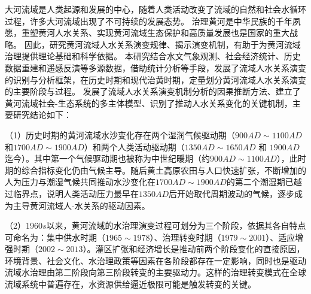 \begin{cabstract}



大河流域是人类起源和发展的中心，随着人类活动改变了流域的自然和社会水循环过程，许多大河流域出现了不可持续的发展态势。
治理黄河是中华民族的千年夙愿，重塑黄河人水关系、实现黄河流域生态保护和高质量发展也是国家的重大战略。
因此，研究黄河流域人水关系演变规律、揭示演变机制，有助于为黄河流域治理提供理论基础和科学依据。
本研究结合水文气象观测、社会经济统计、历史数据重建和遥感反演等多源数据，借助统计分析等手段，发展了流域人水关系演变的识别与分析框架，在历史时期和现代治黄时期，定量划分黄河流域人水关系演变的主要阶段与过程。
发展了流域人水关系演变机制分析的因果推断方法、建立了黄河流域社会-生态系统的多主体模型、识别了推动人水关系变化的关键机制，主要研究结论如下：

（1）历史时期的黄河流域水沙变化存在两个湿润气候驱动期（$900AD\sim1100AD$和$1700AD\sim1900AD$）和两个人类活动驱动期（$1350AD \sim 1650AD$ 和 $1900AD$迄今）。其中第一个气候驱动期也被称为中世纪暖期（约$900AD \sim 1100AD$），此时期的综合指标变化仍由气候主导。随后黄土高原农田与人口快速扩张，不断增加的人为压力与潮湿气候共同推动水沙变化在$1700AD \sim 1900AD$的第二个潮湿期已越过临界点，说明人类活动压力最早在$1350AD$后开始取代周期波动的气候，逐步成为主导黄河流域人-水关系的驱动因素。

（2）$1960s$以来，黄河流域的水治理演变过程可划分为三个阶段，依据其各自特点可命名为：集中供水时期（$1965 \sim 1978$）、治理转变时期（$1979 \sim 2001$）、适应增强时期（$2002 \sim 2013$）。灌区扩张和经济增长是推动前两个阶段变化的直接原因，环境背景、社会文化、水治理政策等因素在各阶段都存在一定影响，同时也是驱动流域水治理由第二阶段向第三阶段转变的主要驱动力。这样的治理转变模式在全球流域系统中普遍存在，水资源供给逼近极限可能是触发转变的关键。


\end{cabstract}
